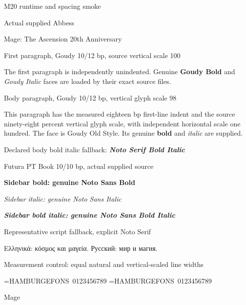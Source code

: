 \documentclass[10pt,letterpaper]{article}
\begin{document}
\thispagestyle{empty}
{\abbess\fontsize{24bp}{25bp}\selectfont M20 runtime and spacing smoke\par}
\vspace{7.2bp}
{\abbess\fontsize{18bp}{18bp}\selectfont Actual supplied Abbess\par}
{\abbess\fontsize{12bp}{14bp}\selectfont Mage: The Ascension 20th Anniversary\par}
\vspace{12bp}
\noindent First paragraph, Goudy 10/12 bp, source vertical scale 100\par
{\fontsize{10bp}{12bp}\selectfont\noindent The first paragraph is independently unindented. Genuine \textbf{Goudy Bold} and \textit{Goudy Italic} faces are loaded by their exact source files.\par}
\vspace{6bp}
\noindent Body paragraph, Goudy 10/12 bp, vertical glyph scale 98\par
{\bodycompressed\fontsize{10bp}{12bp}\selectfont This paragraph has the measured eighteen bp first-line indent and the source ninety-eight percent vertical glyph scale, with independent horizontal scale one hundred. The face is Goudy Old Style. Its genuine \textbf{bold} and \textit{italic} are supplied.\par}
\vspace{6bp}
\noindent Declared body bold italic fallback: {\textbf{\textit{Noto Serif Bold Italic}}}\par
\vspace{12bp}
{\futura\fontsize{10bp}{10bp}\selectfont\noindent Futura PT Book 10/10 bp, actual supplied source\par
\textbf{Sidebar bold: genuine Noto Sans Bold}\par
\textit{Sidebar italic: genuine Noto Sans Italic}\par
\textbf{\textit{Sidebar bold italic: genuine Noto Sans Bold Italic}}\par}
\vspace{12bp}
\noindent Representative script fallback, explicit Noto Serif\par
{\supplement\fontsize{10bp}{12bp}\selectfont\noindent Ελληνικά: κόσμος και μαγεία. Русский: мир и магия.\par}
\vspace{12bp}
\noindent Measurement control: equal natural and vertical-scaled line widths\par
\newbox\mNatural\newbox\mCompressed
\setbox\mNatural=\hbox{\fontsize{10bp}{12bp}\selectfont HAMBURGEFONS 0123456789}
\setbox\mCompressed=\hbox{\bodycompressed\fontsize{10bp}{12bp}\selectfont HAMBURGEFONS 0123456789}
\noindent\box\mNatural\par
\noindent\box\mCompressed\par
\vspace{12bp}
{\abbess\fontsize{60bp}{54bp}\selectfont Mage\par}
\end{document}
